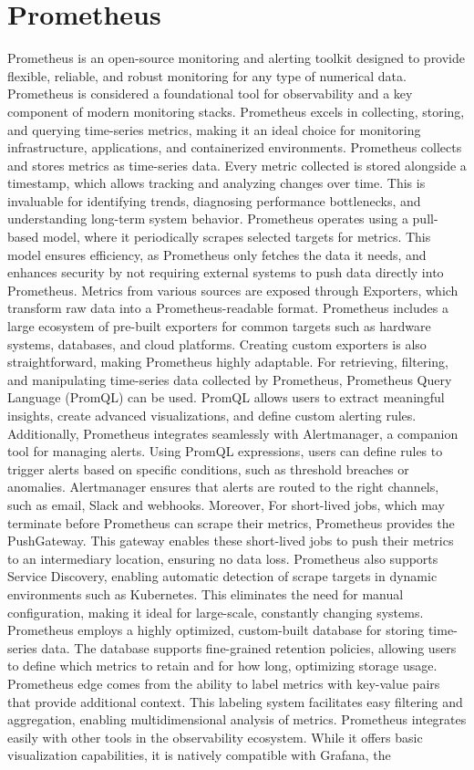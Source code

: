 \section{Prometheus}
Prometheus is an open-source monitoring and alerting toolkit designed to provide flexible, reliable, and robust monitoring for any type of numerical data. Prometheus is considered a foundational tool for observability and a key component of modern monitoring stacks. Prometheus excels in collecting, storing, and querying time-series metrics, making it an ideal choice for monitoring infrastructure, applications, and containerized environments. Prometheus collects and stores metrics as time-series data. Every metric collected is stored alongside a timestamp, which allows tracking and analyzing changes over time. This is invaluable for identifying trends, diagnosing performance bottlenecks, and understanding long-term system behavior. Prometheus operates using a pull-based model, where it periodically scrapes selected targets for metrics. This model ensures efficiency, as Prometheus only fetches the data it needs, and enhances security by not requiring external systems to push data directly into Prometheus. Metrics from various sources are exposed through Exporters, which transform raw data into a Prometheus-readable format. Prometheus includes a large ecosystem of pre-built exporters for common targets such as hardware systems, databases, and cloud platforms. Creating custom exporters is also straightforward, making Prometheus highly adaptable. For retrieving, filtering, and manipulating time-series data collected by Prometheus, Prometheus Query Language (PromQL) can be used. PromQL allows users to extract meaningful insights, create advanced visualizations, and define custom alerting rules. Additionally, Prometheus integrates seamlessly with Alertmanager, a companion tool for managing alerts. Using PromQL expressions, users can define rules to trigger alerts based on specific conditions, such as threshold breaches or anomalies. Alertmanager ensures that alerts are routed to the right channels, such as email, Slack and webhooks. Moreover, For short-lived jobs, which may terminate before Prometheus can scrape their metrics, Prometheus provides the PushGateway. This gateway enables these short-lived jobs to push their metrics to an intermediary location, ensuring no data loss. Prometheus also supports Service Discovery, enabling automatic detection of scrape targets in dynamic environments such as Kubernetes. This eliminates the need for manual configuration, making it ideal for large-scale, constantly changing systems. Prometheus employs a highly optimized, custom-built database for storing time-series data. The database supports fine-grained retention policies, allowing users to define which metrics to retain and for how long, optimizing storage usage. Prometheus edge comes from the ability to label metrics with key-value pairs that provide additional context. This labeling system facilitates easy filtering and aggregation, enabling multidimensional analysis of metrics. Prometheus integrates easily with other tools in the observability ecosystem. While it offers basic visualization capabilities, it is natively compatible with Grafana, the 